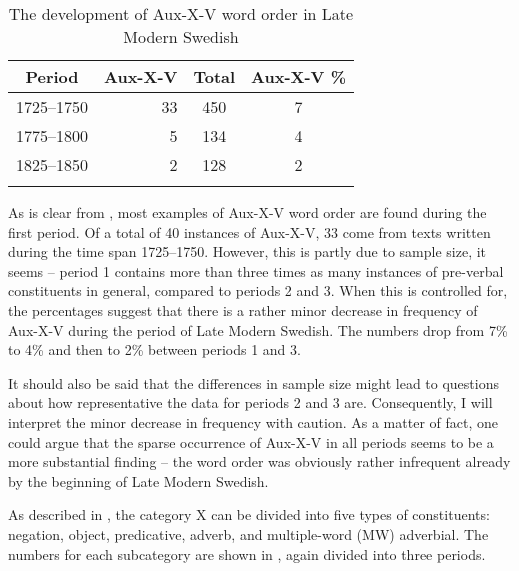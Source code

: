 \documentclass[output=paper, colorlinks, citecolor=brown]{langscibook}
\begin{document}
\begin{table}
\caption{The development of Aux-X-V word order in Late Modern Swedish\label{tab:sangfelt:1}}
\begin{tabular}{crcc}
\lsptoprule
Period & {Aux-X-V} & Total & {Aux-X-V} \%\\
\midrule
1725–1750 & 33 & 450 & 7\\
1775–1800 & 5 & 134 & 4\\
1825–1850 & 2 & 128 & 2\\
\lspbottomrule
\end{tabular}
\end{table}

As is clear from , most examples of Aux-X-V word order are found during the first period. Of a total of 40 instances of Aux-X-V, 33 come from texts written during the time span 1725–1750. However, this is partly due to sample size, it seems – period 1 contains more than three times as many instances of pre-verbal constituents in general, compared to periods 2 and 3. When this is controlled for, the percentages suggest that there is a rather minor decrease in frequency of Aux-X-V during the period of Late Modern Swedish. The numbers drop from 7\% to 4\% and then to 2\% between periods 1 and 3.

It should also be said that the differences in sample size might lead to questions about how representative the data for periods 2 and 3 are. Consequently, I will interpret the minor decrease in frequency with caution. As a matter of fact, one could argue that the sparse occurrence of Aux-X-V in all periods seems to be a more substantial finding – the word order was obviously rather infrequent already by the beginning of Late Modern Swedish.

As described in , the category X can be divided into five types of constituents: negation, object, predicative, adverb, and multiple-word (MW) adverbial. The numbers for each subcategory are shown in , again divided into three periods.
\end{document}

